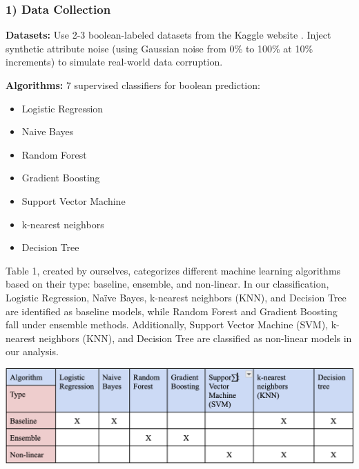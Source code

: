 \documentclass[conference]{IEEEtran}
\begin{document}
\subsubsection*{1) Data Collection}

\textbf{Datasets:} Use 2-3 boolean-labeled datasets from the Kaggle website \cite{kaggle}. Inject synthetic attribute noise (using Gaussian noise from 0\% to 100\% at 10\% increments) to simulate real-world data corruption.

\vspace{0.5em}
\textbf{Algorithms:} 7 supervised classifiers for boolean prediction:
\begin{itemize}[noitemsep, leftmargin=*]
    \item Logistic Regression
    \item Naive Bayes
    \item Random Forest
    \item Gradient Boosting
    \item Support Vector Machine
    \item k-nearest neighbors
    \item Decision Tree

\end{itemize}
\newline

\newline
\newline
\caption{Table 1, created by ourselves, categorizes different machine learning algorithms based on their type: baseline, ensemble, and non-linear. In our classification, Logistic Regression, Naïve Bayes, k-nearest neighbors (KNN), and Decision Tree are identified as baseline models, while Random Forest and Gradient Boosting fall under ensemble methods. Additionally, Support Vector Machine (SVM), k-nearest neighbors (KNN), and Decision Tree are classified as non-linear models in our analysis.}
\newline

\begin{table}[htbp]
    \includegraphics[width=\linewidth, keepaspectratio]{img.png} %
    \caption{}
    \label{table:algorithms}
\end{table}
\end{document}
